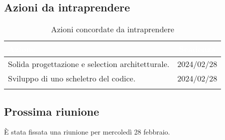\newpage
\subsection{Azioni da intraprendere} \label{subsec:action}

{
\setlength{\tabcolsep}{10pt}
\renewcommand{\arraystretch}{1.5}
\begin{xltabular}{\textwidth}{| X | c |}
    \hline
     \textbf{\textcolor{white}{Azione}} & \textbf{\textcolor{white}{Scadenza}} \\
    \hline
    \endhead
    Solida progettazione e selection architetturale. & 2024/02/28\\
    \hline
    Sviluppo di uno scheletro del codice. & 2024/02/28\\
    \hline
     \caption{Azioni concordate da intraprendere}
    \label{tab:reqimp}
\end{xltabular}
}

\subsection{Prossima riunione} \label{subsec:riunione}
È stata fissata una riunione per mercoledì 28 febbraio.
